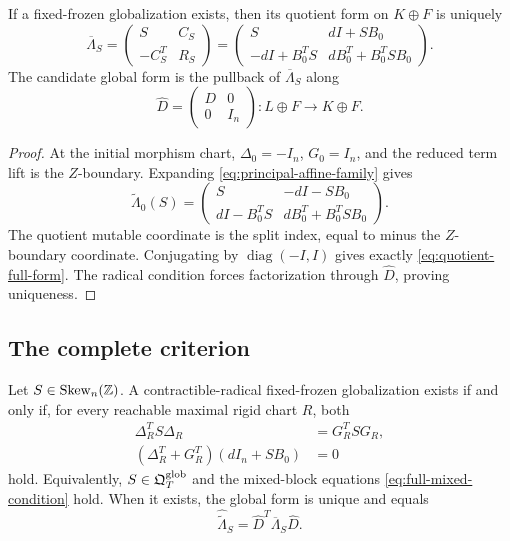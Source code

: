 \begin{lemma}
\label{lem:initial-quotient-full}
If a fixed-frozen globalization exists, then its quotient form on $K\oplus F$
is uniquely
\begin{equation}
 \overline\Lambda_S=
 \begin{pmatrix}
  S&C_S\\
  -C_S^T&R_S
 \end{pmatrix}
 =
 \begin{pmatrix}
  S&dI+SB_0\\
  -dI+B_0^TS&dB_0^T+B_0^TSB_0
 \end{pmatrix}.
 \label{eq:quotient-full-form}
\end{equation}
The candidate global form is the pullback of
$\overline\Lambda_S$ along
\[
 \widehat D=\begin{pmatrix}D&0\\0&I_n\end{pmatrix}:
 L\oplus F\longrightarrow K\oplus F.
\]
\end{lemma}

\begin{proof}
At the initial morphism chart,
$\Delta_0=-I_n$, $G_0=I_n$, and the reduced term lift is the $Z$-boundary.
Expanding \cref{eq:principal-affine-family} gives
\[
 \widetilde\Lambda_0(S)=
 \begin{pmatrix}
  S&-dI-SB_0\\
  dI-B_0^TS&dB_0^T+B_0^TSB_0
 \end{pmatrix}.
\]
The quotient mutable coordinate is the split index, equal to minus the
$Z$-boundary coordinate.  Conjugating by
$\operatorname{diag}(-I,I)$ gives exactly
\cref{eq:quotient-full-form}.  The radical condition forces factorization
through $\widehat D$, proving uniqueness.
\end{proof}

\subsection{The complete criterion}

\begin{theorem}
\label{thm:full-globalization-criterion}
Let $S\in\operatorname{Skew}_n(\mathbb Z)$.  A contractible-radical fixed-frozen
globalization exists if and only if, for every reachable maximal rigid chart
$R$, both
\begin{align}
 \Delta_R^TS\Delta_R&=G_R^TSG_R,
 \label{eq:full-mutable-condition}\\
 (\Delta_R^T+G_R^T)(dI_n+SB_0)&=0
 \label{eq:full-mixed-condition}
\end{align}
hold.  Equivalently, $S\in\mathfrak Q^{\mathrm{glob}}_T$ and the mixed-block equations
\cref{eq:full-mixed-condition} hold.  When it exists, the global form is
unique and equals
\begin{equation}
 \widehat{\widetilde\Lambda}_S
 =\widehat D^T\overline\Lambda_S\widehat D.
 \label{eq:full-global-form}
\end{equation}
\end{theorem}

